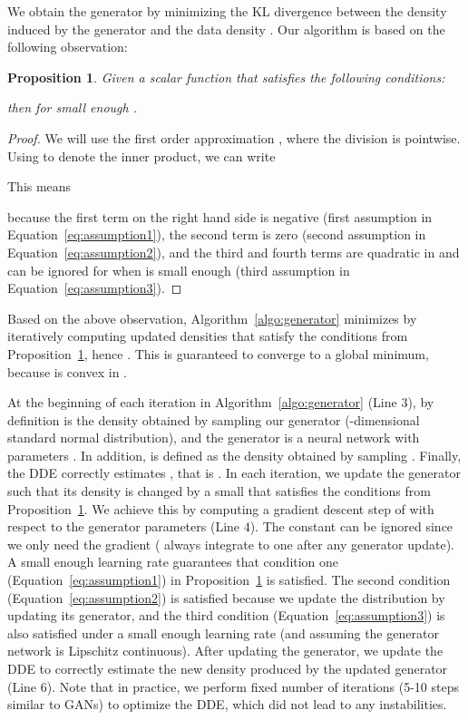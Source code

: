 \documentclass{article}
\newtheorem{proposition}{Proposition}
\begin{document}
We obtain the generator by minimizing the KL divergence  between the density induced by the generator  and the data density . Our algorithm is based on the following observation:

\begin{proposition}
Given a scalar function  that satisfies the following conditions:

then  for small enough .
\label{pro:klupdate}
\end{proposition}

\begin{proof}
We will use the first order approximation , where the division is pointwise. Using  to denote the inner product, we can write

This means

because the first term on the right hand side is negative (first assumption in Equation~\ref{eq:assumption1}), the second term is zero (second assumption in Equation~\ref{eq:assumption2}), and the third and fourth terms are quadratic in  and can be ignored for  when  is small enough (third assumption in Equation~\ref{eq:assumption3}).
\end{proof}
Based on the above observation, Algorithm~\ref{algo:generator} minimizes  by iteratively computing updated densities  that satisfy the conditions from Proposition~\ref{pro:klupdate}, hence . This is guaranteed to converge to a global minimum, because  is convex in . 

At the beginning of each iteration in Algorithm~\ref{algo:generator} (Line 3), by definition  is the density obtained by sampling our generator  (-dimensional standard normal distribution), and the generator is a neural network with parameters . In addition,  is defined as the density obtained by sampling . Finally, the DDE  correctly estimates , that is . 
In each iteration, we update the generator such that its density is changed by a small  that satisfies the conditions from Proposition~\ref{pro:klupdate}. We achieve this by computing a gradient descent step of  with respect to the generator parameters  (Line 4). The constant  can be ignored since we only need the gradient ( always integrate to one after any generator update). A small enough learning rate guarantees that condition one (Equation~\ref{eq:assumption1}) in Proposition~\ref{pro:klupdate} is satisfied. The second condition (Equation~\ref{eq:assumption2}) is satisfied because we update the distribution by updating its generator, and the third condition (Equation~\ref{eq:assumption3}) is also satisfied under a small enough learning rate (and assuming the generator network is Lipschitz continuous). After updating the generator, we update the DDE to correctly estimate the new density produced by the updated generator (Line 6). Note that in practice, we perform fixed number of iterations (5-10 steps similar to GANs) to optimize the DDE, which did not lead to any instabilities.
\end{document}
